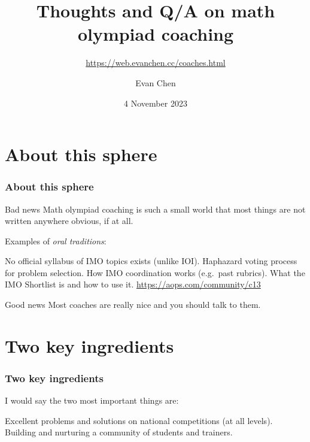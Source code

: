 \documentclass[10pt]{beamer}
\begin{document}
\title{Thoughts and Q/A on math olympiad coaching}
\subtitle{\url{https://web.evanchen.cc/coaches.html}}
\author{Evan Chen}
\date{4 November 2023}

\maketitle

\section{About this sphere}
\begin{frame}
  \frametitle{About this sphere}
  \begin{alertblock}{Bad news}
    Math olympiad coaching is such a small world that
    most things are not written anywhere obvious, if at all.
  \end{alertblock}
  \pause
  Examples of \emph{oral traditions}:
  \begin{itemize}
    \ii No official syllabus of IMO topics exists (unlike IOI).
    \ii Haphazard voting process for problem selection.
    \ii How IMO coordination works (e.g.\ past rubrics).
    \ii What the IMO Shortlist is and how to use it.
    \ii \url{https://aops.com/community/c13}
  \end{itemize}
  \pause
  \begin{exampleblock}{Good news}
    Most coaches are really nice and you should talk to them.
  \end{exampleblock}
\end{frame}

\section{Two key ingredients}
\begin{frame}
  \frametitle{Two key ingredients}
  I would say the \alert{two most important things} are:
  \begin{itemize}
    \ii Excellent problems and solutions on national competitions (at all levels).
    \ii Building and nurturing a community of students and trainers.
  \end{itemize}
\end{frame}
\end{document}
